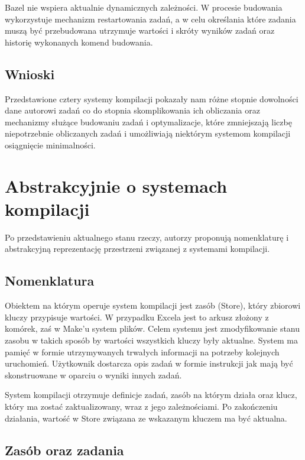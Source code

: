 Bazel nie wspiera aktualnie dynamicznych zależności. W procesie budowania wykorzystuje mechanizm restartowania zadań, a w celu określania które zadania muszą być przebudowana utrzymuje wartości i skróty wyników zadań oraz historię wykonanych komend budowania.

\subsection{Wnioski}

Przedstawione cztery systemy kompilacji pokazały nam różne stopnie dowolności dane autorowi zadań co do stopnia skomplikowania ich obliczania oraz mechanizmy służące budowaniu zadań i optymalizacje, które zmniejszają liczbę niepotrzebnie obliczanych zadań i umożliwiają niektórym systemom kompilacji osiągnięcie minimalności.

\section{Abstrakcyjnie o systemach kompilacji}

Po przedstawieniu aktualnego stanu rzeczy, autorzy proponują nomenklaturę i abstrakcyjną reprezentację przestrzeni związanej z systemami kompilacji.

\subsection{Nomenklatura}

Obiektem na którym operuje system kompilacji jest zasób (Store), który zbiorowi kluczy przypisuje wartości. W przypadku Excela jest to arkusz złożony z komórek, zaś w Make'u system plików. Celem systemu jest zmodyfikowanie stanu zasobu w takich sposób by wartości wszystkich kluczy były aktualne. System ma pamięć w formie utrzymywanych trwałych informacji na potrzeby kolejnych uruchomień. Użytkownik dostarcza opis zadań w formie instrukcji jak mają być skonstruowane w oparciu o wyniki innych zadań.

System kompilacji otrzymuje definicje zadań, zasób na którym działa oraz klucz, który ma zostać zaktualizowany, wraz z jego zależnościami. Po zakończeniu działania, wartość w Store związana ze wskazanym kluczem ma być aktualna.

\subsection{Zasób oraz zadania}

